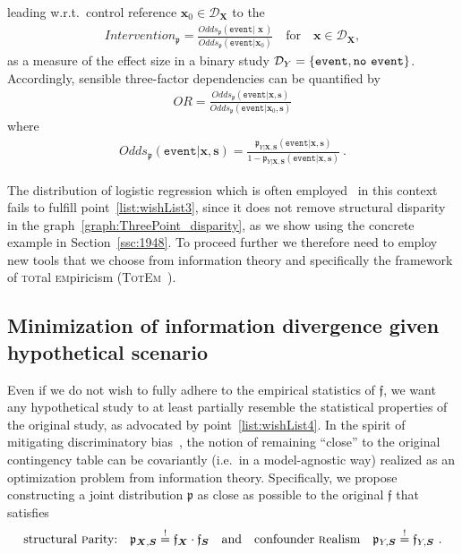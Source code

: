 \documentclass[10pt]{article}
\newcommand{\totem}{\textsc{Tot}\textsc{Em}\xspace}
\newcommand{\equ}[1]{\begin{gather} #1 \end{gather}}
\newcommand{\quads}[1]{\quad #1 \quad}
\newcommand{\qand}{\quad \text{and} \quad}
\newcommand{\prob}[1]{\mathfrak{#1}}
\begin{document}
leading w.r.t.\ control reference  $\boldsymbol x_0\in\mathcal D_{\boldsymbol X}$  to the  
\equ{
Intervention_{\prob p} = \frac{Odds_{\prob p}(\texttt{event}\vert \,\,\boldsymbol x\,)}{Odds_{\prob p}(\texttt{event}\vert \boldsymbol x_0)}
\quads{\text{for}} \boldsymbol x\in\mathcal D_{\boldsymbol X},
}
as a measure of the effect size in a binary study $\mathcal D_Y = \{\texttt{event}, \texttt{no\,\,event}\}$.
Accordingly, sensible three-factor dependencies can be quantified by 
\equ{
OR = \frac{Odds_{\prob p}(\texttt{event}\vert \boldsymbol x, \boldsymbol s)}{Odds_{\prob p}(\texttt{event}\vert \boldsymbol x_0, \boldsymbol s)}
}
where 
\equ{
Odds_{\prob p}(\texttt{event}\vert \boldsymbol x, \boldsymbol s) = \frac{\prob p_{Y\vert\boldsymbol  X,\boldsymbol S}(\texttt{event}\vert \boldsymbol x, \boldsymbol s)}{1-\prob p_{Y\vert\boldsymbol  X,\boldsymbol S}(\texttt{event}\vert \boldsymbol  x,\boldsymbol s)}
~.
}


The distribution of logistic regression which is often employed~\cite{pourhoseingholi2012control,cepeda2003comparison} in this context fails to fulfill point~\ref{list:wishList3}, since it does not remove structural disparity in the graph~\ref{graph:ThreePoint_disparity}, as we show using the concrete example in Section~\ref{ssc:1948}.
To proceed further we therefore need to employ new tools that we choose from information theory and specifically the framework of \textsc{tot}al \textsc{em}piricism  (\totem~\cite{loukas2023total}).


\subsection{Minimization of information divergence given hypothetical scenario}
\label{ssc:iDiv}

%
Even if we do not wish to fully adhere to the empirical statistics of $\prob f$, we want any  hypothetical study %
to at least partially  resemble the  statistical properties of the original study, as advocated by point~\ref{list:wishList4}. 
In the spirit of mitigating discriminatory bias~\cite{loukas2023demographic}, the notion of remaining ``close'' to the original contingency table can be covariantly (i.e.\ in a  model-agnostic way) realized as an optimization problem from information theory.
Specifically, we  propose
constructing a joint distribution $\prob p$ as close as possible to the original $\prob f$
that satisfies 
\equ{
\label{eq:PRconditions}
\text{structural \textsc{p}arity:}\quad \prob p_{\boldsymbol X,\boldsymbol S} \overset{!}{=} \prob f_{\boldsymbol X} \cdot \prob f_{\boldsymbol S}
\qand
\text{confounder \textsc{r}ealism}\quad \prob p_{Y,\boldsymbol S}\overset{!}{=} \prob f_{Y,\boldsymbol S}
~.
}
\end{document}
